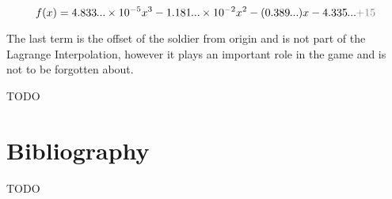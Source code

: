 \documentclass[12pt, titlepage]{article}
\newcommand{\TODO}{\begin{center}\color{red}TODO\end{center}}
\begin{document}
\newcommand\smalldots{\makebox[0.75em][c]{.\hfil.\hfil.}}

$$f(x) = 4.833\smalldots \times 10^{-5} x^3- 1.181\smalldots{} \times 10^{-2} x^2 - (0.389\smalldots{}) x - 4.335\smalldots \textcolor{gray}{+ 15}$$

The last term is the offset of the soldier from origin and is not part of the
Lagrange Interpolation, however it plays an important role in the game and 
is not to be forgotten about.

\TODO

\section{Bibliography}
\appendix
\TODO
\end{document}
